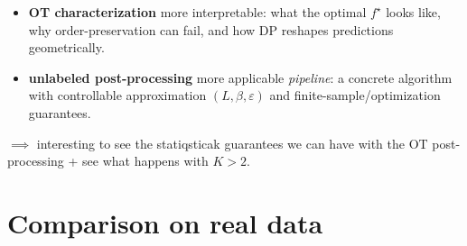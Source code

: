 \documentclass[11pt]{article}
\begin{document}
\begin{itemize}
  \item \textbf{OT characterization} more interpretable:
        what the optimal $f^\star$ looks like, why order-preservation can fail, and how DP reshapes predictions geometrically.
  \item \textbf{unlabeled post-processing} more applicable \emph{pipeline}:
        a concrete algorithm with controllable approximation  $(L,\beta,\varepsilon)$ and finite-sample/optimization guarantees.
\end{itemize}

$\implies$ interesting to see the statiqsticak guarantees we can have with the OT post-processing + see what happens with $K>2$.


\clearpage
\part{Comparison on real data}
\label{part:comparison}


\end{document}
